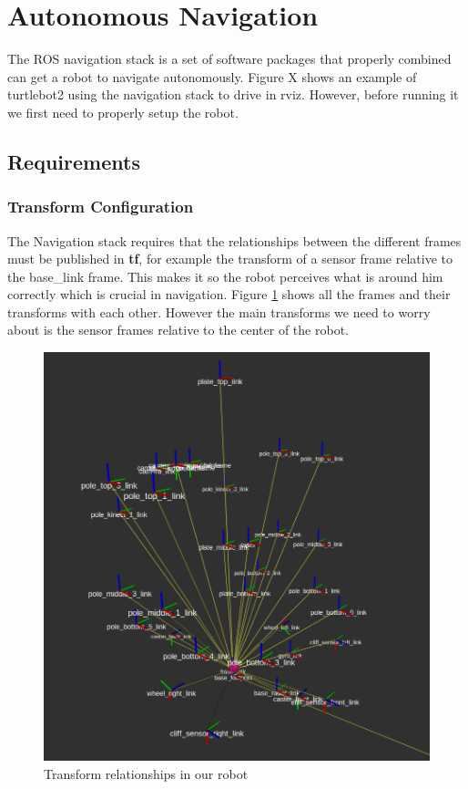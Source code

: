 \documentclass[12pt]{article}
\begin{document}
\section{Autonomous Navigation}
The ROS navigation stack is a set of software packages that properly combined can get a robot to navigate autonomously.
Figure X  shows an example of turtlebot2 using the navigation stack to drive in rviz.
However, before running it we first need to properly setup the robot.
\subsection{Requirements}
\subsubsection{Transform Configuration}
The Navigation stack requires that the relationships between the different frames must be published in \textbf{tf}, for example the transform of a sensor frame relative to the  base\_link frame. This makes it so the robot perceives what is around him correctly which is crucial in navigation.
Figure \ref{fig:tf} shows all the frames and their transforms with each other. However the main transforms we need to worry about is the sensor frames relative to the center of the robot.
\begin{figure}[!htb]
    \centering
    \includegraphics[scale=0.2]{tf.png}
    \caption{Transform relationships in our robot}
    \label{fig:tf}
\end{figure}
\end{document}
